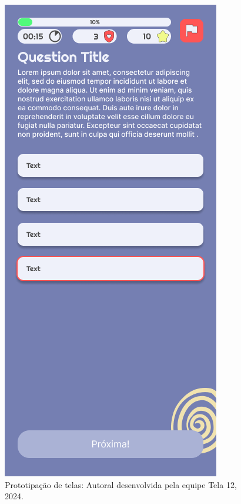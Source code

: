 \documentclass[12pt, openany, oneside, a4paper, english, brazil]{abntex2}   %
\begin{document}
\begin{figure}
    \centering
    \includegraphics[scale=0.7]{figuras/Math.Pow App/Question Multiple Choice Without Image.png}
    \caption{Prototipação de telas: Autoral desenvolvida pela equipe Tela 12, 2024.}
    \label{fig:nome-da-imagem}
\end{figure}
\end{document}
